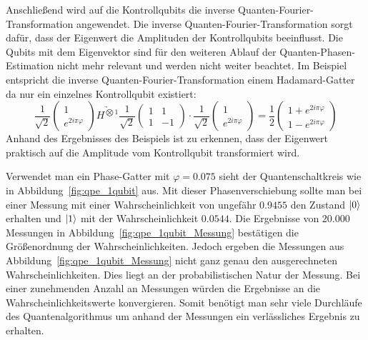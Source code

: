 Anschließend wird auf die Kontrollqubits die inverse Quanten-Fourier-Transformation angewendet.
Die inverse Quanten-Fourier-Transformation sorgt dafür, 
dass der Eigenwert die Amplituden der Kontrollqubits beeinflusst.
Die Qubits mit dem Eigenvektor sind für den weiteren Ablauf der Quanten-Phasen-Estimation nicht mehr relevant 
und werden nicht weiter beachtet.
Im Beispiel entspricht die inverse Quanten-Fourier-Transformation einem Hadamard-Gatter da nur ein einzelnes Kontrollqubit existiert:
\[
\frac{1}{\sqrt{2}}
\begin{pmatrix}
  1 \\
  e^{2 i \pi \varphi}
 \end{pmatrix}
 \underrightarrow{H^{\bigotimes 1}}
 \frac{1}{\sqrt{2}}
 \begin{pmatrix}
  1 & 1\\
  1 & -1
 \end{pmatrix}
 \cdot
 \frac{1}{\sqrt{2}}
\begin{pmatrix}
  1 \\
  e^{2 i \pi \varphi}
 \end{pmatrix}
 =
 \frac{1}{2}
 \begin{pmatrix}
  1 + e^{2 i \pi \varphi}\\
  1 - e^{2 i \pi \varphi}
 \end{pmatrix}
\]
Anhand des Ergebnisses des Beispiels ist zu erkennen, dass der Eigenwert praktisch auf die Amplitude vom Kontrollqubit transformiert wird.

Verwendet man ein Phase-Gatter mit \(\varphi  = 0.075\) sieht der Quantenschaltkreis wie in Abbildung~\ref{fig:qpe_1qubit} aus.
Mit dieser Phasenverschiebung sollte man bei einer Messung mit einer Wahrscheinlichkeit von ungefähr
\(0.9455\) den Zustand \(\ket{0}\) erhalten und \(\ket{1}\) mit der Wahrscheinlichkeit \(0.0544\).
Die Ergebnisse von 20.000 Messungen in Abbildung~\ref{fig:qpe_1qubit_Messung} bestätigen die Größenordnung der Wahrscheinlichkeiten.
Jedoch ergeben die Messungen aus Abbildung~\ref{fig:qpe_1qubit_Messung} nicht ganz genau den ausgerechneten Wahrscheinlichkeiten.
Dies liegt an der probabilistischen Natur der Messung.
Bei einer zunehmenden Anzahl an Messungen würden die Ergebnisse an die Wahrscheinlichkeitswerte konvergieren.
Somit benötigt man sehr viele Durchläufe des Quantenalgorithmus um anhand der Messungen ein verlässliches Ergebnis zu erhalten.


